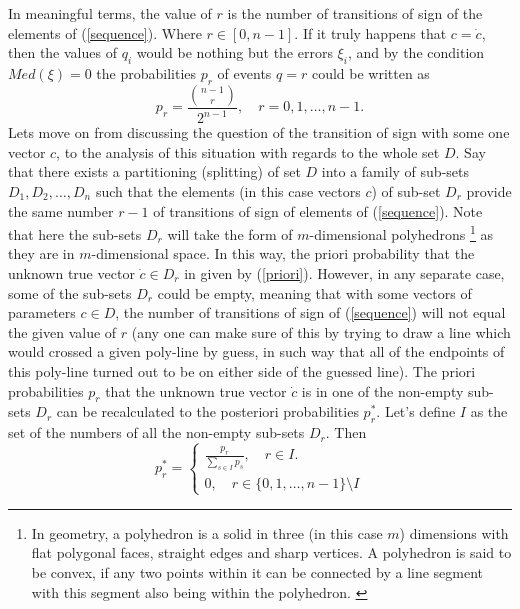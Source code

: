 In meaningful terms, the value of $r$ is the number of transitions of sign of the elements of  (\ref{sequence}). Where $r \in [0,n-1]$. If it truly happens that $c=\dot{c}$, then the values of $q_{i}$ would be nothing but the errors $\xi_{i}$, and by the condition $Med(\xi)=0$ the probabilities $p_{r}$ of events $q = r$ could be written as
\begin{equation}
p_{r}= \frac{\binom {n-1}r}{2^{n-1}}, \quad r = 0,1,\dots,n-1. \label{priori}
\end{equation}
Lets move on from discussing the question of the transition of sign with some one vector $c$, to the analysis of this situation with regards to the whole set $D$. Say that there exists a partitioning (splitting) of set $D$ into a family of sub-sets $D_{1},D_{2},\dots,D_{n}$ such that the elements (in this case vectors $c$) of sub-set $D_{r}$ provide the same number $r-1$ of transitions of sign of elements of (\ref{sequence}). Note that here the sub-sets $D_{r}$ will take the form of $m$-dimensional polyhedrons \footnote{In geometry, a polyhedron is a solid in three (in this case $m$) dimensions with flat polygonal faces, straight edges and sharp vertices. A polyhedron is said to be convex, if any two points within it can be connected by a line segment with this segment also being within the polyhedron. \cite{cromwell_1999}} as they are in $m$-dimensional space. In this way, the priori probability that the unknown true vector $\dot{c} \in D_{r}$ in given by (\ref{priori}). However, in any separate case, some of the sub-sets $D_{r}$ could be empty, meaning  that with some vectors of parameters $c \in D$, the number of transitions of sign of (\ref{sequence}) will not equal the given value of $r$ (any one can make sure of this by trying to draw a line which would crossed a given poly-line by guess, in such way that all of the endpoints of this poly-line turned out to be on either side of the guessed line). The priori probabilities $p_{r}$ that the unknown true vector $\dot{c}$ is in one of the non-empty sub-sets $D_{r}$ can be recalculated to the posteriori probabilities $p_{r}^{*}$. Let's define $I$ as the set of the numbers of all the non-empty sub-sets $D_{r}$. Then
\begin{equation}
p_{r}^{*}= 
\begin{cases} 
		\frac{p_{r}}{\sum\limits_{s \in I}p_{s}}, \quad r \in I.\\
		0, \quad r \in \{ 0,1,\dots,n-1 \} \setminus I
\end{cases}
\end{equation}
